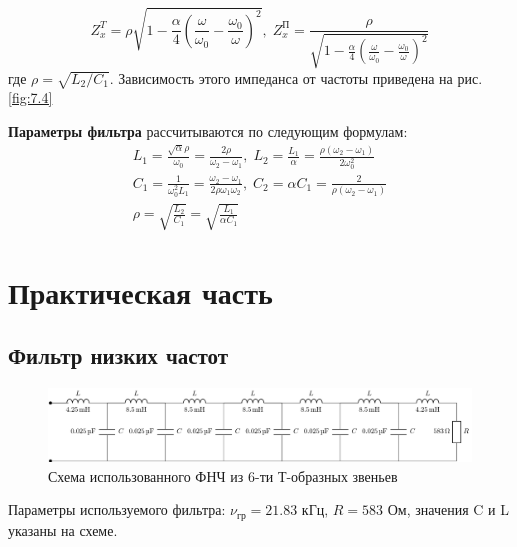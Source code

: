 \begin{equation}
\label{eq:7.7}
Z^T_x=\rho\sqrt{1-\frac{\alpha}{4}\left(\frac{\omega}{\omega_0}-\frac{\omega_0}{\omega}\right)^2},\;
Z^\text{П}_x=\frac{\rho}{\sqrt{1-\frac{\alpha}{4}\left(\frac{\omega}{\omega_0}-\frac{\omega_0}{\omega}\right)^2}}
\end{equation}
где $\rho=\sqrt{L_2/C_1}$. Зависимость этого импеданса от частоты приведена на рис.\ref{fig:7.4}

\textbf{Параметры фильтра} рассчитываются по следующим формулам:
\begin{equation}
\label{eq:7.8}
\begin{gathered}
L_1=\frac{\sqrt{\alpha}\rho}{\omega_0}=\frac{2\rho}{\omega_2-\omega_1},\;
L_2=\frac{L_1}{\alpha}=\frac{\rho(\omega_2-\omega_1)}{2\omega^2_0}\\
C_1=\frac{1}{\omega^2_0L_1}=\frac{\omega_2-\omega_1}{2\rho\omega_1\omega_2},\;
C_2=\alpha C_1=\frac{2}{\rho(\omega_2-\omega_1)}\\
\rho=\sqrt{\frac{L_2}{C_1}}=\sqrt{\frac{L_1}{\alpha C_1}}
\end{gathered}
\end{equation}

\section{Практическая часть}
\subsection{Фильтр низких частот}
\begin{figure}[H]
	\centering
	\includegraphics[scale=0.75]{chem/chem3}
	\caption{ Схема использованного ФНЧ из 6-ти Т-образных звеньев}
	\label{fig:chem3}
\end{figure}
Параметры используемого фильтра:
$\nu_{\text{гр}}=21.83 \text{ кГц} ,\,R=583\text{ Ом}$, значения C и L указаны на схеме.

